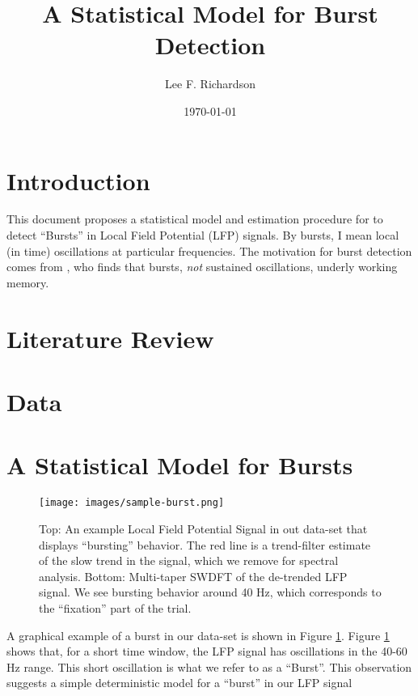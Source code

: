 \documentclass[11pt]{article}
\theoremstyle{plain}
\theoremstyle{definition}
\begin{document}
\title{{\Large A Statistical Model for Burst Detection}}
\author{Lee F. Richardson}
\date{\today}
\maketitle

\section{Introduction}
This document proposes a statistical model and estimation procedure for to detect ``Bursts'' in Local Field Potential (LFP) signals. By bursts, I mean local (in time) oscillations at particular frequencies. The motivation for burst detection comes from \cite{lundqvist2016gamma}, who finds that bursts, {\it not} sustained oscillations, underly working memory. 

\section{Literature Review}
\label{sec:lit-review}

\section{Data}
\label{sec:data}

\section{A Statistical Model for Bursts}
\label{sec:model}

\begin{figure}[!ht]
  \centering
  \texttt{[image: images/sample-burst.png]}
  \caption{Top: An example Local Field Potential Signal in out data-set that displays ``bursting'' behavior. The red line is a trend-filter estimate of the slow trend in the signal, which we remove for spectral analysis. Bottom: Multi-taper SWDFT of the de-trended LFP signal. We see bursting behavior around 40 Hz, which corresponds to the ``fixation'' part of the trial.}
\label{fig:example-burst}
\end{figure}

A graphical example of a burst in our data-set is shown in Figure \ref{fig:example-burst}. Figure \ref{fig:example-burst} shows that, for a short time window, the LFP signal has oscillations in the 40-60 Hz range. This short oscillation is what we refer to as a ``Burst''. This observation suggests a simple deterministic model for a ``burst'' in our LFP signal
\end{document}
